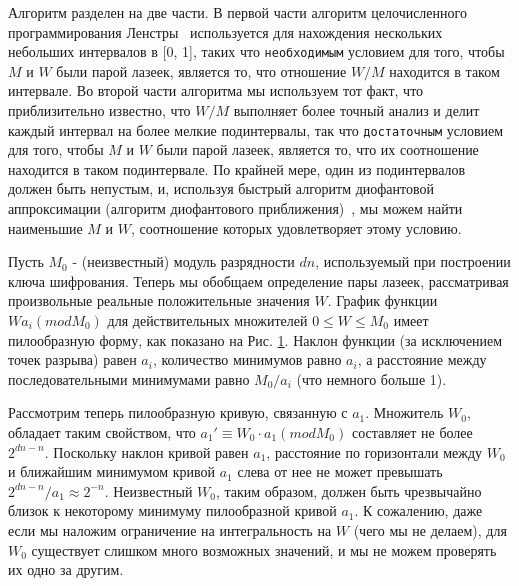 \documentclass[a4paper,12pt]{report}
\newcommand{\mono}[1]{{\small\texttt{#1}}}
\begin{document}
Алгоритм разделен на две части. В первой части алгоритм целочисленного программирования Ленстры~\cite{knuth} используется для нахождения нескольких небольших интервалов в [0, 1], таких что \mono{необходимым} условием для того, чтобы $M$ и $W$ были парой лазеек, является то, что отношение $W/M$ находится в таком интервале. Во второй части алгоритма мы используем тот факт, что приблизительно известно, что $W/M$ выполняет более точный анализ и делит каждый интервал на более мелкие подинтервалы, так что \mono{достаточным} условием для того, чтобы $M$ и $W$ были парой лазеек, является то, что их соотношение находится в таком подинтервале. По крайней мере, один из подинтервалов должен быть непустым, и, используя быстрый алгоритм диофантовой аппроксимации (алгоритм диофантового приближения)~\cite{cassels}, мы можем найти наименьшие $M$ и $W$, соотношение которых удовлетворяет этому условию.

\begin{figure}[h]
\centering
{}
\caption{}\label{fig 1}
\end{figure}


Пусть $M_0$ - (неизвестный) модуль разрядности $dn$, используемый при построении ключа шифрования. Теперь мы обобщаем определение пары лазеек, рассматривая произвольные реальные положительные значения $W$. График функции $Wa_i(mod M_0)$ для действительных множителей $0 \leq W \leq M_0$ имеет пилообразную форму, как показано на Рис. \ref{fig 1}. Наклон функции (за исключением точек разрыва) равен $a_i$, количество минимумов равно $a_i$, а расстояние между последовательными минимумами равно $M_0/a_i$ (что немного больше 1).

Рассмотрим теперь пилообразную кривую, связанную с $a_1$. Множитель $W_0$, обладает таким свойством, что $a_1' \equiv W_0 \cdot a_1 (mod M_0)$ составляет не более $2^{dn - n}$. Поскольку наклон кривой равен $a_1$, расстояние по горизонтали между $W_0$ и ближайшим минимумом кривой $a_1$ слева от нее не может превышать $2^{dn - n}/a_1 \approx 2^{-n}$. Неизвестный $W_0$, таким образом, должен быть чрезвычайно близок к некоторому минимуму пилообразной кривой $a_1$. К сожалению, даже если мы наложим ограничение на интегральность на $W$ (чего мы не делаем), для $W_0$ существует слишком много возможных значений, и мы не можем проверять их одно за другим.
\end{document}

